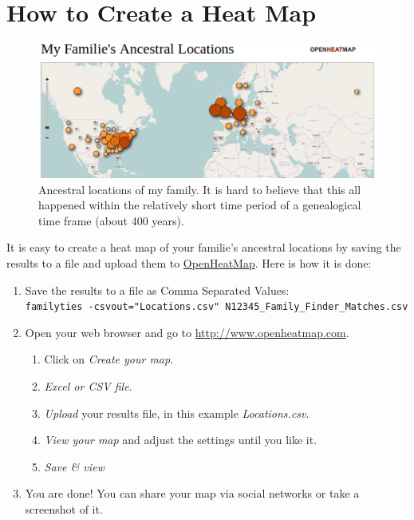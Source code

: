 \documentclass[12pt,a4paper]{article}
\begin{document}
\section{How to Create a Heat Map}

\begin{figure}[ht]
\centering
\includegraphics[width=13cm]{ancestral-locations.png}
\caption{Ancestral locations of my family. It is hard
to believe that this all happened within the relatively 
short time period of a genealogical time frame (about 400 years).}
\end{figure}

It is easy to create a heat map of your familie's ancestral locations
by saving the results to a file and upload them to
\href{http://www.openheatmap.com/}{OpenHeatMap}.
Here is how it is done:

\begin{enumerate}
\item Save the results to a file as Comma Separated Values:\\
  \texttt{familyties -csvout="Locations.csv"  N12345\_Family\_Finder\_Matches.csv}
\item Open your web browser and go to
      \href{http://www.openheatmap.com/}{http://www.openheatmap.com}.
	\begin{enumerate}
	\item Click on \emph{Create your map}.
	\item \emph{Excel or CSV file}.
	\item \emph{Upload} your results file,
            in this example \emph{Locations.csv}.
	\item \emph{View your map} and adjust the settings until you like it.
	\item \emph{Save \& view}
	\end{enumerate}
\item You are done! You can share your map via social networks
  or take a screenshot of it.
\end{enumerate}
\end{document}

